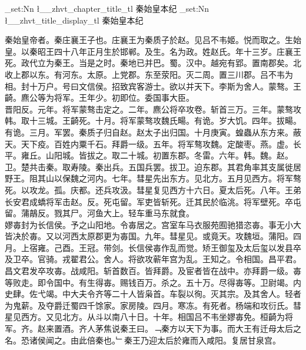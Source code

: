 \documentclass{zhvt-classic}
\begin{document}
\clearpage
\ExplSyntaxOn
\tl_set:Nn \l__zhvt_chapter_title_tl { 秦始皇本纪 }
\tl_set:Nn \l__zhvt_title_display_tl { 秦始皇本纪 }
\ExplSyntaxOff
\maketitle






\hspace*{2em}秦始皇帝者。秦庄襄王子也。庄襄王为秦质子於赵。见吕不韦姬。悦而取之。生始皇。以秦昭王四十八年正月生於邯郸。及生。名为政。姓赵氏。年十三岁。庄襄王死。政代立为秦王。当是之时。秦地已并巴。蜀。汉中。越宛有郢。置南郡矣。北收上郡以东。有河东。太原。上党郡。东至荥阳。灭二周。置三川郡。吕不韦为相。封十万户。号曰文信侯。招致宾客游士。欲以并天下。李斯为舍人。蒙骜。王齮。麃公等为将军。王年少。初即位。委国事大臣。\\
\hspace*{2em}晋阳反。元年。将军蒙骜击定之。二年。麃公将卒攻卷。斩首三万。三年。蒙骜攻韩。取十三城。王齮死。十月。将军蒙骜攻魏氏畼。有诡。岁大饥。四年。拔畼。有诡。三月。军罢。秦质子归自赵。赵太子出归国。十月庚寅。蝗蟲从东方来。蔽天。天下疫。百姓内粟千石。拜爵一级。五年。将军骜攻魏。定酸枣。燕。虚。长平。雍丘。山阳城。皆拔之。取二十城。初置东郡。冬雷。六年。韩。魏。赵。卫。楚共击秦。取寿陵。秦出兵。五国兵罢。拔卫。迫东郡。其君角率其支属徙居野王。阻其山以保魏之河内。七年。彗星先出东方。见北方。五月见西方。将军骜死。以攻龙。孤。庆都。还兵攻汲。彗星复见西方十六日。夏太后死。八年。王弟长安君成蟜将军击赵。反。死屯留。军吏皆斩死。迁其民於临洮。将军壁死。卒屯留。蒲鶮反。戮其尸。河鱼大上。轻车重马东就食。\\
\hspace*{2em}嫪毐封为长信侯。予之山阳地。令毐居之。宫室车马衣服苑囿驰猎恣毐。事无小大皆决於毐。又以河西太原郡更为毐国。九年。彗星见。或竟天。攻魏垣。蒲阳。四月。上宿雍。己酉。王冠。带剑。长信侯毐作乱而觉。矫王御玺及太后玺以发县卒及卫卒。官骑。戎翟君公。舍人。将欲攻蕲年宫为乱。王知之。令相国。昌平君。昌文君发卒攻毐。战咸阳。斩首数百。皆拜爵。及宦者皆在战中。亦拜爵一级。毐等败走。即令国中。有生得毐。赐钱百万。杀之。五十万。尽得毐等。卫尉竭。内史肆。佐弋竭。中大夫令齐等二十人皆枭首。车裂以徇。灭其宗。及其舍人。轻者为鬼薪。及夺爵迁蜀四千馀家。家房陵。四月。寒冻。有死者。杨端和攻衍氏。彗星见西方。又见北方。从斗以南八十日。十年。相国吕不韦坐嫪毐免。桓齮为将军。齐。赵来置酒。齐人茅焦说秦王曰。﹁秦方以天下为事。而大王有迁母太后之名。恐诸侯闻之。由此倍秦也。﹂秦王乃迎太后於雍而入咸阳。复居甘泉宫。\\
\end{document}
